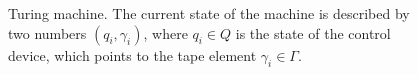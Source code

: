 \begin{figure}
\centering



\caption{Turing machine. The current state of the machine is described by two
  numbers $(q_i, \gamma_i)$, where $q_i \in Q$ is the state of the control
  device, which points to the tape element $\gamma_i \in \Gamma$.} 
\label{figAddAlgoTuring}
\end{figure}